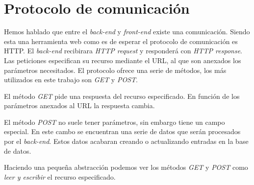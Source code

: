 \section{Protocolo de comunicación}
  	Hemos hablado que entre el \emph{back-end} y \emph{front-end} existe una comunicación. Siendo esta una herramienta web como es de esperar el
	protocolo de comunicación es HTTP\cite{HTTP}. El \emph{back-end} recibirara \emph{HTTP request} y responderá con \emph{HTTP response}. Las
	peticiones especifican su recurso mediante el URL, al que son anexados los parámetros necesitados. El protocolo ofrece una serie de
	métodos, los más utilizados en este trabajo son \emph{GET} y \emph{POST}. 
	\par
	El método \emph{GET} pide una respuesta del recurso especificado. En función de los parámetros anexados al URL la respuesta cambia.
	\par
	El método \emph{POST} no suele tener parámetros, sin embargo tiene un campo especial. En este cambo se encuentran una serie de datos que serán
	procesados por el \emph{back-end}. Estos datos acabaran creando o actualizando entradas en la base de datos. 
	\par
	Haciendo una pequeña abstracción podemos ver los métodos \emph{GET} y \emph{POST} como \emph{leer y escribir} el recurso especificado.


